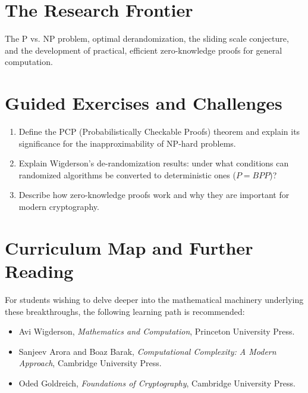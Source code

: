 \section{The Research Frontier}
The P vs. NP problem, optimal derandomization, the sliding scale conjecture, and the development of practical, efficient zero-knowledge proofs for general computation.

\section{Guided Exercises and Challenges}
\begin{enumerate}[label=\textbf{\arabic*.}]
  \item Define the PCP (Probabilistically Checkable Proofs) theorem and explain its significance for the inapproximability of NP-hard problems.
  \item Explain Wigderson's de-randomization results: under what conditions can randomized algorithms be converted to deterministic ones ($P = BPP$)?
  \item Describe how zero-knowledge proofs work and why they are important for modern cryptography.
\end{enumerate}

\section{Curriculum Map and Further Reading}
For students wishing to delve deeper into the mathematical machinery underlying these breakthroughs, the following learning path is recommended:
\begin{itemize}
  \item Avi Wigderson, \emph{Mathematics and Computation}, Princeton University Press.
  \item Sanjeev Arora and Boaz Barak, \emph{Computational Complexity: A Modern Approach}, Cambridge University Press.
  \item Oded Goldreich, \emph{Foundations of Cryptography}, Cambridge University Press.
\end{itemize}

